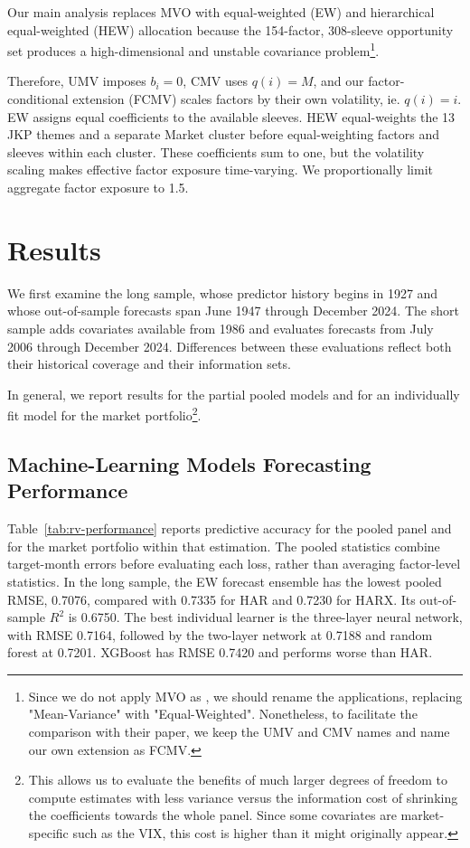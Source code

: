 \documentclass[preprint,12pt,authoryear]{elsarticle}
\begin{document}
Our main analysis replaces MVO with equal-weighted (EW) and hierarchical equal-weighted (HEW) allocation because the 154-factor, 308-sleeve opportunity set produces a high-dimensional and unstable covariance problem\footnote{Since we do not apply MVO as \citet{demiguelmartinutrerauppal2024}, we should rename the applications, replacing "Mean-Variance" with "Equal-Weighted". Nonetheless, to facilitate the comparison with their paper, we keep the UMV and CMV names and name our own extension as FCMV.}.

 Therefore, UMV imposes $b_i=0$, CMV uses $q(i)=M$, and our factor-conditional  extension (FCMV) scales factors by their own volatility, ie. $q(i)=i$. EW assigns equal coefficients to the available sleeves. HEW equal-weights the 13 JKP themes and a separate Market cluster before equal-weighting factors and sleeves within each cluster. These coefficients sum to one, but the volatility scaling makes effective factor exposure time-varying. We proportionally limit aggregate factor exposure to 1.5.



\section{Results}
\label{sec:results}

We first examine the long sample, whose predictor history begins in 1927 and whose out-of-sample forecasts span June 1947 through December 2024. The short sample adds covariates available from 1986 and evaluates forecasts from July 2006 through December 2024.  Differences between these evaluations reflect both their historical coverage and their information sets. 

In general, we report results for the partial pooled models and for an individually fit model for the market portfolio\footnote{This allows us to evaluate the benefits of much larger degrees of freedom to compute estimates with less variance versus the information cost of shrinking the coefficients towards the whole panel. Since some covariates are market-specific such as the VIX, this cost is higher than it might originally appear.}. 

\subsection{Machine-Learning Models Forecasting Performance}

Table~\ref{tab:rv-performance} reports predictive accuracy for the pooled panel and for the market portfolio within that estimation. The pooled statistics combine target-month errors before evaluating each loss, rather than averaging factor-level statistics. In the long sample, the EW forecast ensemble has the lowest pooled RMSE, 0.7076, compared with 0.7335 for HAR and 0.7230 for HARX. Its out-of-sample $R^2$ is 0.6750. The best individual learner is the three-layer neural network, with RMSE 0.7164, followed by the two-layer network at 0.7188 and random forest at 0.7201. XGBoost has RMSE 0.7420 and performs worse than HAR. 
\end{document}
